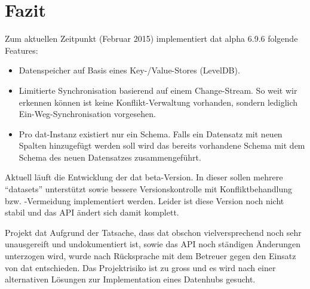 \chapter{Fazit}
Zum aktuellen Zeitpunkt (Februar 2015) implementiert dat alpha 6.9.6 folgende Features:
\begin{itemize}
\item Datenspeicher auf Basis eines Key-/Value-Stores (LevelDB).
\item Limitierte Synchronisation basierend auf einem Change-Stream. So weit wir erkennen können ist keine Konflikt-Verwaltung vorhanden, sondern lediglich Ein-Weg-Synchronisation vorgesehen.
\item Pro dat-Instanz existiert nur ein Schema. Falls ein Datensatz mit neuen Spalten hinzugefügt werden soll wird das bereits vorhandene Schema mit dem Schema des neuen Datensatzes zusammengeführt.
\end{itemize}

Aktuell läuft die Entwicklung der dat beta-Version. In dieser sollen mehrere ``datasets'' unterstützt sowie bessere Versionskontrolle mit Konfliktbehandlung bzw. -Vermeidung implementiert werden. Leider ist diese Version noch nicht stabil und das API ändert sich damit komplett.

\begin{decision}[label=dec:dat:fazit]{Projekt dat}
Aufgrund der Tatsache, dass \gls{dat} obschon vielversprechend noch sehr unausgereift und undokumentiert ist, sowie das API noch ständigen Änderungen unterzogen wird, wurde nach Rücksprache mit dem Betreuer gegen den Einsatz von \gls{dat} entschieden. Das Projektrisiko ist zu gross und es wird nach einer alternativen Lösungen zur Implementation eines Datenhubs gesucht.
\end{decision}

